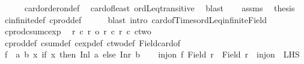 \begin{isabellebody}
\ \ \ \ \isamarkupfalse%
\ card{\isacharunderscore}{\kern0pt}order{\isacharunderscore}{\kern0pt}on{\isacharunderscore}{\kern0pt}def\ \isamarkupfalse%
\ card{\isacharunderscore}{\kern0pt}of{\isacharunderscore}{\kern0pt}least\ ordLeq{\isacharunderscore}{\kern0pt}transitive\ \isamarkupfalse%
\ blast{\isacharplus}{\kern0pt}\isanewline
\ \ \isamarkupfalse%
\ assms\ \isamarkupfalse%
\ {\isacharquery}{\kern0pt}thesis\ \isamarkupfalse%
\ cinfinite{\isacharunderscore}{\kern0pt}def\ cprod{\isacharunderscore}{\kern0pt}def\isanewline
\ \ \ \ \isamarkupfalse%
\ {\isacharparenleft}{\kern0pt}blast\ intro{\isacharcolon}{\kern0pt}\ card{\isacharunderscore}{\kern0pt}of{\isacharunderscore}{\kern0pt}Times{\isacharunderscore}{\kern0pt}ordLeq{\isacharunderscore}{\kern0pt}infinite{\isacharunderscore}{\kern0pt}Field{\isacharparenright}{\kern0pt}\isanewline
{}\isamarkupfalse%
%
\endisatagproof
{\isafoldproof}%
%
\isadelimproof
\isanewline
%
\endisadelimproof
\isanewline
{}\isamarkupfalse%
\ cprod{\isacharunderscore}{\kern0pt}csum{\isacharunderscore}{\kern0pt}cexp{\isacharcolon}{\kern0pt}\isanewline
\ \ {\isachardoublequoteopen}r{}\ {\isacharasterisk}{\kern0pt}c\ r{}\ {\isasymle}o\ {\isacharparenleft}{\kern0pt}r{}\ {\isacharplus}{\kern0pt}c\ r{}{\isacharparenright}{\kern0pt}\ {\isacharcircum}{\kern0pt}c\ ctwo{\isachardoublequoteclose}\isanewline
%
\isadelimproof
%
\endisadelimproof
%
\isatagproof
{}\isamarkupfalse%
\ cprod{\isacharunderscore}{\kern0pt}def\ csum{\isacharunderscore}{\kern0pt}def\ cexp{\isacharunderscore}{\kern0pt}def\ ctwo{\isacharunderscore}{\kern0pt}def\ Field{\isacharunderscore}{\kern0pt}card{\isacharunderscore}{\kern0pt}of\isanewline
{}\isamarkupfalse%
\ {\isacharminus}{\kern0pt}\isanewline
\ \ \isamarkupfalse%
\ {\isacharquery}{\kern0pt}f\ {\isacharequal}{\kern0pt}\ {\isachardoublequoteopen}{\isasymlambda}{\isacharparenleft}{\kern0pt}a{\isacharcomma}{\kern0pt}\ b{\isacharparenright}{\kern0pt}{\isachardot}{\kern0pt}\ {\isacharpercent}{\kern0pt}x{\isachardot}{\kern0pt}\ if\ x\ then\ Inl\ a\ else\ Inr\ b{\isachardoublequoteclose}\isanewline
\ \ \isamarkupfalse%
\ {\isachardoublequoteopen}inj{\isacharunderscore}{\kern0pt}on\ {\isacharquery}{\kern0pt}f\ {\isacharparenleft}{\kern0pt}Field\ r{}\ {\isasymtimes}\ Field\ r{}{\isacharparenright}{\kern0pt}{\isachardoublequoteclose}\ {\isacharparenleft}{\kern0pt}\ {\isachardoublequoteopen}inj{\isacharunderscore}{\kern0pt}on\ {\isacharunderscore}{\kern0pt}\ {\isacharquery}{\kern0pt}LHS{\isachardoublequoteclose}{\isacharparenright}{\kern0pt}\isanewline

\end{isabellebody}
